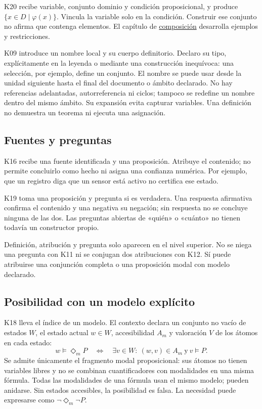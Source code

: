 K20 recibe variable, conjunto dominio y condición proposicional, y produce
\(\{x\in D\mid\varphi(x)\}\). Vincula la variable solo en la condición.
Construir ese conjunto no afirma que contenga elementos. El capítulo de
\hyperref[sec:composicion]{composición} desarrolla ejemplos y restricciones.

K09 introduce un nombre local y su cuerpo definitorio. Declaro su tipo,
explícitamente en la leyenda o mediante una construcción inequívoca: una
selección, por ejemplo, define un conjunto. El nombre se puede usar desde la
unidad siguiente hasta el final del documento o ámbito declarado. No hay
referencias adelantadas, autorreferencia ni ciclos; tampoco se redefine un
nombre dentro del mismo ámbito. Su expansión evita capturar variables.
Una definición no demuestra un teorema ni ejecuta una asignación.

\subsection{Fuentes y preguntas}
K16 recibe una fuente identificada y una proposición. Atribuye el contenido;
no permite concluirlo como hecho ni asigna una confianza numérica. Por ejemplo,
que un registro diga que un sensor está activo no certifica ese estado.

K19 toma una proposición y pregunta si es verdadera. Una respuesta afirmativa
confirma el contenido y una negativa su negación; sin respuesta no se concluye
ninguna de las dos. Las preguntas abiertas de «quién» o «cuánto» no tienen
todavía un constructor propio.

Definición, atribución y pregunta solo aparecen en el nivel superior. No se
niega una pregunta con K11 ni se conjugan dos atribuciones con K12. Sí puede
atribuirse una conjunción completa o una proposición modal con modelo declarado.

\subsection{Posibilidad con un modelo explícito}
K18 lleva el índice de un modelo. El contexto declara un conjunto no vacío
de estados \(W\), el estado actual \(w\in W\), accesibilidad \(A_m\) y
valoración \(V\) de los átomos en cada estado:
\[
w\models\Diamond_m P\quad\Longleftrightarrow\quad
\exists v\in W:\ (w,v)\in A_m\ \text{y}\ v\models P.
\]
Se admite únicamente el fragmento modal proposicional: sus átomos no tienen
variables libres y no se combinan cuantificadores con modalidades en una
misma fórmula. Todas las modalidades de una fórmula usan el mismo modelo;
pueden anidarse. Sin estados accesibles, la posibilidad es falsa. La necesidad
puede expresarse como \(\neg\Diamond_m\neg P\).


